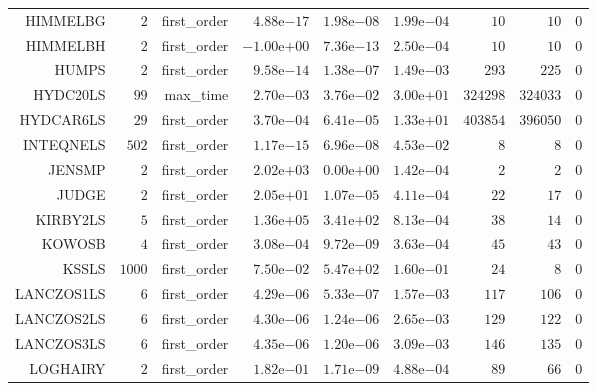 \begin{longtable}{rrrrrrrrr}
HIMMELBG & \(     2\) & first\_order & \( 4.88\)e\(-17\) & \( 1.98\)e\(-08\) & \( 1.99\)e\(-04\) & \(    10\) & \(    10\) & \(     0\) \\
HIMMELBH & \(     2\) & first\_order & \(-1.00\)e\(+00\) & \( 7.36\)e\(-13\) & \( 2.50\)e\(-04\) & \(    10\) & \(    10\) & \(     0\) \\
HUMPS & \(     2\) & first\_order & \( 9.58\)e\(-14\) & \( 1.38\)e\(-07\) & \( 1.49\)e\(-03\) & \(   293\) & \(   225\) & \(     0\) \\
HYDC20LS & \(    99\) & max\_time & \( 2.70\)e\(-03\) & \( 3.76\)e\(-02\) & \( 3.00\)e\(+01\) & \(324298\) & \(324033\) & \(     0\) \\
HYDCAR6LS & \(    29\) & first\_order & \( 3.70\)e\(-04\) & \( 6.41\)e\(-05\) & \( 1.33\)e\(+01\) & \(403854\) & \(396050\) & \(     0\) \\
INTEQNELS & \(   502\) & first\_order & \( 1.17\)e\(-15\) & \( 6.96\)e\(-08\) & \( 4.53\)e\(-02\) & \(     8\) & \(     8\) & \(     0\) \\
JENSMP & \(     2\) & first\_order & \( 2.02\)e\(+03\) & \( 0.00\)e\(+00\) & \( 1.42\)e\(-04\) & \(     2\) & \(     2\) & \(     0\) \\
JUDGE & \(     2\) & first\_order & \( 2.05\)e\(+01\) & \( 1.07\)e\(-05\) & \( 4.11\)e\(-04\) & \(    22\) & \(    17\) & \(     0\) \\
KIRBY2LS & \(     5\) & first\_order & \( 1.36\)e\(+05\) & \( 3.41\)e\(+02\) & \( 8.13\)e\(-04\) & \(    38\) & \(    14\) & \(     0\) \\
KOWOSB & \(     4\) & first\_order & \( 3.08\)e\(-04\) & \( 9.72\)e\(-09\) & \( 3.63\)e\(-04\) & \(    45\) & \(    43\) & \(     0\) \\
KSSLS & \(  1000\) & first\_order & \( 7.50\)e\(-02\) & \( 5.47\)e\(+02\) & \( 1.60\)e\(-01\) & \(    24\) & \(     8\) & \(     0\) \\
LANCZOS1LS & \(     6\) & first\_order & \( 4.29\)e\(-06\) & \( 5.33\)e\(-07\) & \( 1.57\)e\(-03\) & \(   117\) & \(   106\) & \(     0\) \\
LANCZOS2LS & \(     6\) & first\_order & \( 4.30\)e\(-06\) & \( 1.24\)e\(-06\) & \( 2.65\)e\(-03\) & \(   129\) & \(   122\) & \(     0\) \\
LANCZOS3LS & \(     6\) & first\_order & \( 4.35\)e\(-06\) & \( 1.20\)e\(-06\) & \( 3.09\)e\(-03\) & \(   146\) & \(   135\) & \(     0\) \\
LOGHAIRY & \(     2\) & first\_order & \( 1.82\)e\(-01\) & \( 1.71\)e\(-09\) & \( 4.88\)e\(-04\) & \(    89\) & \(    66\) & \(     0\) \\

\end{longtable}
